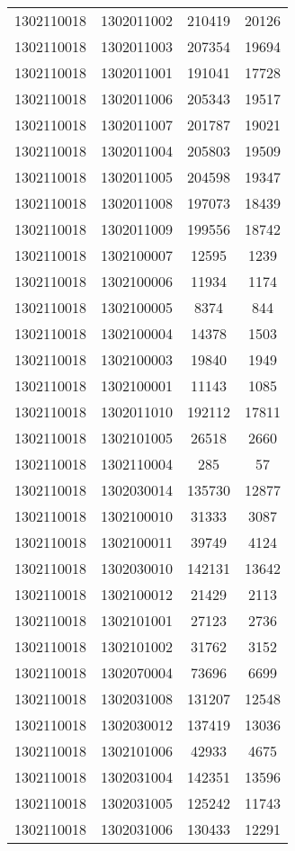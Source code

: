 \begin{longtable}[h]{llcc}
		1302110018 & 1302011002 & 210419 & 20126\\
		1302110018 & 1302011003 & 207354 & 19694\\
		1302110018 & 1302011001 & 191041 & 17728\\
		1302110018 & 1302011006 & 205343 & 19517\\
		1302110018 & 1302011007 & 201787 & 19021\\
		1302110018 & 1302011004 & 205803 & 19509\\
		1302110018 & 1302011005 & 204598 & 19347\\
		1302110018 & 1302011008 & 197073 & 18439\\
		1302110018 & 1302011009 & 199556 & 18742\\
		1302110018 & 1302100007 & 12595 & 1239\\
		1302110018 & 1302100006 & 11934 & 1174\\
		1302110018 & 1302100005 & 8374 & 844\\
		1302110018 & 1302100004 & 14378 & 1503\\
		1302110018 & 1302100003 & 19840 & 1949\\
		1302110018 & 1302100001 & 11143 & 1085\\
		1302110018 & 1302011010 & 192112 & 17811\\
		1302110018 & 1302101005 & 26518 & 2660\\
		1302110018 & 1302110004 & 285 & 57\\
		1302110018 & 1302030014 & 135730 & 12877\\
		1302110018 & 1302100010 & 31333 & 3087\\
		1302110018 & 1302100011 & 39749 & 4124\\
		1302110018 & 1302030010 & 142131 & 13642\\
		1302110018 & 1302100012 & 21429 & 2113\\
		1302110018 & 1302101001 & 27123 & 2736\\
		1302110018 & 1302101002 & 31762 & 3152\\
		1302110018 & 1302070004 & 73696 & 6699\\
		1302110018 & 1302031008 & 131207 & 12548\\
		1302110018 & 1302030012 & 137419 & 13036\\
		1302110018 & 1302101006 & 42933 & 4675\\
		1302110018 & 1302031004 & 142351 & 13596\\
		1302110018 & 1302031005 & 125242 & 11743\\
		1302110018 & 1302031006 & 130433 & 12291\\

\end{longtable}
